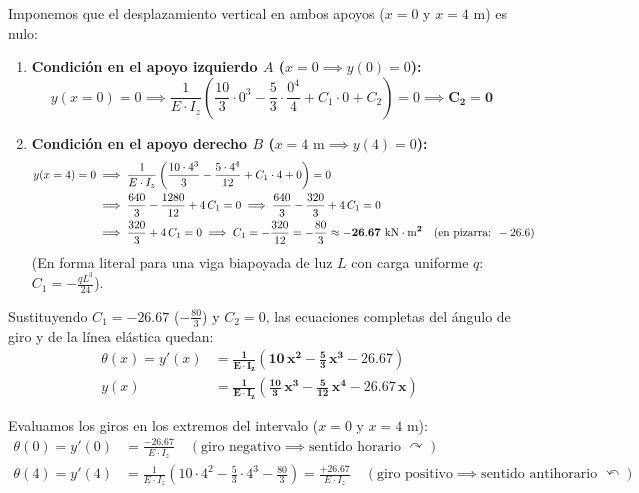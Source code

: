 {    Imponemos que el desplazamiento vertical en ambos apoyos ($x = 0$ y $x = 4\text{ m}$) es nulo:
    \begin{enumerate}
        \item \textbf{Condición en el apoyo izquierdo $A$ ($x = 0 \implies y(0) = 0$):}
              \begin{equation}
                  y(x = 0) = 0 \implies \frac{1}{E \cdot I_z} \left( \frac{10}{3} \cdot 0^3 - \frac{5}{3} \cdot \frac{0^4}{4} + C_1 \cdot 0 + C_2 \right) = 0 \implies \mathbf{C_2 = 0}
              \end{equation}
        \item \textbf{Condición en el apoyo derecho $B$ ($x = 4\text{ m} \implies y(4) = 0$):}
              \begin{align}
                  y(x = 4) = 0 & \implies \frac{1}{E \cdot I_z} \left( \frac{10 \cdot 4^3}{3} - \frac{5 \cdot 4^4}{12} + C_1 \cdot 4 + 0 \right) = 0 \notag \\
                               & \implies \frac{640}{3} - \frac{1280}{12} + 4\,C_1 = 0 \implies \frac{640}{3} - \frac{320}{3} + 4\,C_1 = 0 \notag          \\
                               & \implies \frac{320}{3} + 4\,C_1 = 0 \implies C_1 = -\frac{320}{12} = -\frac{80}{3} \approx \mathbf{-26.67\text{ kN}\cdot\text{m}^2} \quad (\text{en pizarra: } -26.6)
              \end{align}
              (En forma literal para una viga biapoyada de luz $L$ con carga uniforme $q$: $C_1 = -\frac{qL^3}{24}$).
    \end{enumerate}

    Sustituyendo $C_1 = -26.67$ ($-\frac{80}{3}$) y $C_2 = 0$, las ecuaciones completas del ángulo de giro y de la línea elástica quedan:
    \begin{align}
        \theta(x) = y'(x) & = \mathbf{\frac{1}{E \cdot I_z} \left( 10\,x^2 - \frac{5}{3}\,x^3 - 26.67 \right)}                \\
        y(x)              & = \mathbf{\frac{1}{E \cdot I_z} \left( \frac{10}{3}\,x^3 - \frac{5}{12}\,x^4 - 26.67\,x \right)}
    \end{align}


    Evaluamos los giros en los extremos del intervalo ($x = 0$ y $x = 4\text{ m}$):
    \begin{align}
        \theta(0) = y'(0) & = \frac{-26.67}{E \cdot I_z} \quad (\text{giro negativo} \implies \text{sentido horario } \curvearrowright)              \\
        \theta(4) = y'(4) & = \frac{1}{E \cdot I_z}\left(10 \cdot 4^2 - \frac{5}{3} \cdot 4^3 - \frac{80}{3}\right) = \frac{+26.67}{E \cdot I_z} \quad (\text{giro positivo} \implies \text{sentido antihorario } \curvearrowleft)
    \end{align}

}
